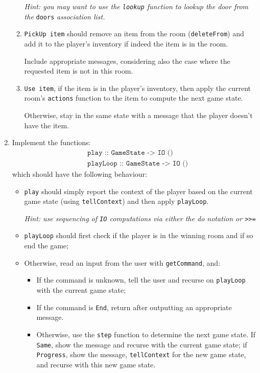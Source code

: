 \documentclass{article}
\newcommand{\topMarks}[1]{\marginnote{(#1 marks)}}
\begin{document}
\begin{enumerate}[leftmargin=1.4em,resume]
\begin{enumerate}
\emph{Hint: you may want to use the \texttt{lookup} function to
lookup the door from the} \texttt{doors} \emph{association list.}

\item \texttt{PickUp item} should
remove an item from the room (\texttt{deleteFrom}) and add it to the player's
inventory if indeed the item is in the room.

Include appropriate messages, considering also the case where
the requested item is not in this room.

\item \texttt{Use item}, if the item
is in the player's inventory, then
apply the current room's \texttt{actions} function
to the item to compute the next game state.

Otherwise, stay in the same state with a message
that the player doesn't have the item.
\end{enumerate}

\item \topMarks{12} Implement the functions:
%
\begin{align*}
& \texttt{play :: GameState -> IO ()} \\
& \texttt{playLoop :: GameState -> IO ()}
\end{align*}
%
which should have the following behaviour:
%
\begin{itemize}
\item \texttt{play} should simply report the context of the player based on the current game state
  (using \texttt{tellContext}) and then apply \texttt{playLoop}.

\emph{Hint: use sequencing of \texttt{IO} computations via either
the \emph{do} notation or \texttt{>>=}}
%
\item \texttt{playLoop} should first check if the player is in the winning room
  and if so end the game;
\item Otherwise, read an input from the user with \texttt{getCommand}, and:
 \begin{itemize}[leftmargin=1em]
   \item If the command is unknown, tell the user and recurse on
     \texttt{playLoop} with the current game state;
   \item If the command is \texttt{End}, return after outputting an
     appropriate message.
   \item Otherwise, use the \texttt{step} function to determine
     the next game state. If \texttt{Same}, show the
     message and recurse with the current game state; if
     \texttt{Progress}, show the message, \texttt{tellContext} for the
     new game state, and recurse with this new game state.
\end{itemize}
\end{itemize}


\end{enumerate}
\end{document}
